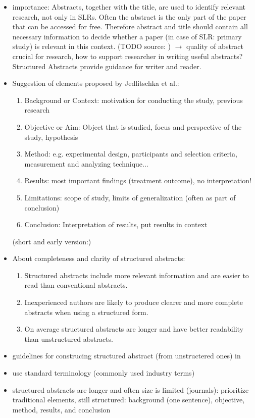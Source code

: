 \begin{itemize}
\item importance: Abstracts, together with the title, are used to identify relevant research, not only in SLRs. Often the abstract is the only part of the paper that can be accessed for free. Therefore abstract and title should contain all necessary information to decide whether a paper (in case of SLR: primary study) is relevant in this context. (TODO source: )
	$\rightarrow$ quality of abstract crucial for research, how to support researcher in writing useful abstracts? Structured Abstracts provide guidance for writer and reader. 
\item Suggestion of elements proposed by Jedlitschka et al.\cite{Jedlitschka2008}: 
	\begin{enumerate}
		\item Background or Context: motivation for conducting the study, previous research
		\item Objective or Aim: Object that is studied, focus and perspective of the study, hypothesis
		\item Method: e.g. experimental design, participants and selection criteria, measurement and analyzing technique...
		\item Results: most important findings (treatment outcome), no interpretation!
		\item Limitations: scope of study, limits of generalization (often as part of conclusion)
		\item Conclusion: Interpretation of results, put results in context
	\end{enumerate}
	(short and early version:\cite{Jedlitschka2005})
\item About completeness and clarity of structured abstracts:
	\begin{enumerate}
	\item Structured abstracts include more relevant information and are easier to read than conventional abstracts. \cite{Budgen2008} \cite{Budgen2007}
	\item Inexperienced authors are likely to produce clearer and more complete abstracts when using a structured form.\cite{Budgen2011} 
	\item On average structured abstracts are longer and have better readability than unstructured abstracts. \cite{KBO2008}
	\end{enumerate}
\item guidelines for construcing structured abstract (from unstructered ones) in \cite{KBO2008}
\item use standard terminology (commonly used industry terms) \cite{Jedlitschka2008}
\item structured abstracts are longer and often size is limited (journals): prioritize traditional elements, still structured: background (one sentence), objective, method, results, and conclusion \cite{Jedlitschka2008}
\end{itemize}